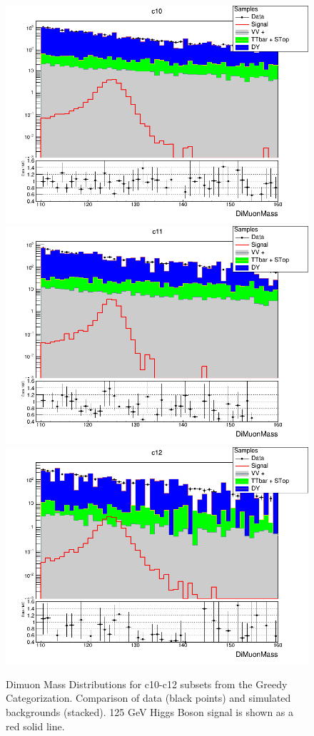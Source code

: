 \begin{figure}[htbp]
  \centering
  \includegraphics[width=0.65\linewidth]{figures/ch_higgs/distributions/bdt_uf/distribution__c10__DiMuonMass__logY.png}\\
  \includegraphics[width=0.65\linewidth]{figures/ch_higgs/distributions/bdt_uf/distribution__c11__DiMuonMass__logY.png}\\
  \includegraphics[width=0.65\linewidth]{figures/ch_higgs/distributions/bdt_uf/distribution__c12__DiMuonMass__logY.png}
  \caption{Dimuon Mass Distributions for c10-c12 subsets from the Greedy Categorization. Comparison of data (black points) and simulated backgrounds (stacked). 125 GeV Higgs Boson signal is shown as a red solid line.}
  \label{fig:higgs_categorization_greedyc10c12}
\end{figure}


